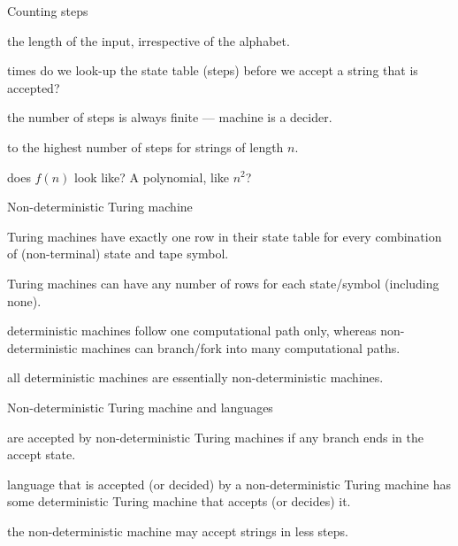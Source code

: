 \documentclass{beamer}
\begin{document}
\begin{frame}{Counting steps}
  \begin{description}
    \setlength\itemsep{6mm}
    \item[$n$] the length of the input, irrespective of the alphabet.
    \item[How many] times do we look-up the state table (steps) before we accept a string that is accepted?
    \item[Assume] the number of steps is always finite --- machine is a decider. 
    \item[Set $f(n)$] to the highest number of steps for strings of length $n$.
    \item[What] does $f(n)$ look like? A polynomial, like $n^2$?
  \end{description}
\end{frame}



\begin{frame}{Non-deterministic Turing machine}
  \begin{description}
    \setlength\itemsep{4mm}
    \item[Deterministic] Turing machines have exactly one row in their state table for every combination of (non-terminal) state and tape symbol.
    \item[Non-deterministic] Turing machines can have any number of rows for each state/symbol (including none).
    \item[Key difference:] deterministic machines follow one computational path only, whereas non-deterministic machines can branch/fork into many computational paths.
    \item[Note:] all deterministic machines are essentially non-deterministic machines. 
  \end{description}
\end{frame}


\begin{frame}{Non-deterministic Turing machine and languages}
  \begin{description}
    \setlength\itemsep{6mm}
    \item[Strings] are accepted by non-deterministic Turing machines if any branch ends in the accept state.
    \item[Any] language that is accepted (or decided) by a non-deterministic Turing machine has some deterministic Turing machine that accepts (or decides) it.
    \item[However,] the non-deterministic machine may accept strings in less steps.
  \end{description}
\end{frame}
\end{document}
